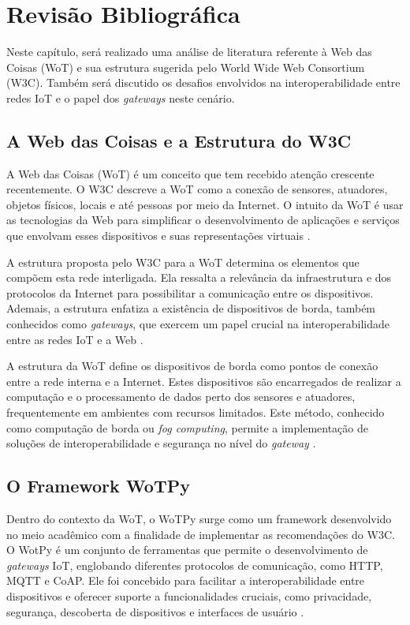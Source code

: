 
\chapter{Revisão Bibliográfica}

Neste capítulo, será realizado uma análise de literatura referente à Web das Coisas (WoT) e sua estrutura sugerida pelo World Wide Web Consortium (W3C). Também será discutido os desafios envolvidos na interoperabilidade entre redes IoT e o papel dos \textit{gateways} neste cenário.

\section{A Web das Coisas e a Estrutura do W3C}

A Web das Coisas (WoT) é um conceito que tem recebido atenção crescente recentemente. O W3C descreve a WoT como a conexão de sensores, atuadores, objetos físicos, locais e até pessoas por meio da Internet. O intuito da WoT é usar as tecnologias da Web para simplificar o desenvolvimento de aplicações e serviços que envolvam esses dispositivos e suas representações virtuais \cite{WoTTerminology, WoTCommunityWiki}.

A estrutura proposta pelo W3C para a WoT determina os elementos que compõem esta rede interligada. Ela ressalta a relevância da infraestrutura e dos protocolos da Internet para possibilitar a comunicação entre os dispositivos. Ademais, a estrutura enfatiza a existência de dispositivos de borda, também conhecidos como \textit{gateways}, que exercem um papel crucial na interoperabilidade entre as redes IoT e a Web \cite{Matsukura:23:WTA}.

A estrutura da WoT define os dispositivos de borda como pontos de conexão entre a rede interna e a Internet. Estes dispositivos são encarregados de realizar a computação e o processamento de dados perto dos sensores e atuadores, frequentemente em ambientes com recursos limitados. Este método, conhecido como computação de borda ou \textit{fog computing}, permite a implementação de soluções de interoperabilidade e segurança no nível do \textit{gateway} \cite{Stirbu2008, Gyrard2017, GARCIAMANGAS2019235}.

\section{O Framework WoTPy}

Dentro do contexto da WoT, o WoTPy surge como um framework desenvolvido no meio acadêmico com a finalidade de implementar as recomendações do W3C. O WotPy é um conjunto de ferramentas que permite o desenvolvimento de \textit{gateways} IoT, englobando diferentes protocolos de comunicação, como HTTP, MQTT e CoAP. Ele foi concebido para facilitar a interoperabilidade entre dispositivos e oferecer suporte a funcionalidades cruciais, como privacidade, segurança, descoberta de dispositivos e interfaces de usuário \cite{GARCIAMANGAS2019235}.